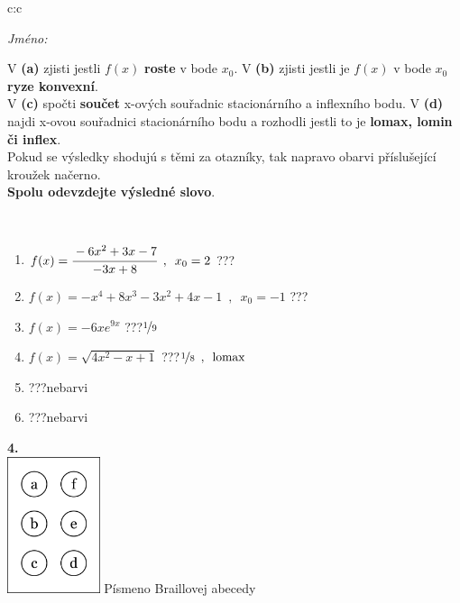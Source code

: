 \documentclass[10pt]{report}
\begin{document}
\begin{tabular}{c:c}
\begin{minipage}[c][104.5mm][t]{0.5\linewidth}
\begin{center}
\textit{Jméno:}\phantom{xxxxxxxxxxxxxxxxxxxxxxxxxxxxxxxxxxxxxxxxxxxxxxxxxxxxxxxxxxxxxxxxx}\\[5mm]
\begin{minipage}{0.95\linewidth}
\begin{center}
{\small V \textbf{(a)} zjisti jestli $f(x)$ \textbf{roste} v bode $x_0$. V \textbf{(b)} zjisti jestli je $f(x)$ v bode $x_0$ \textbf{ryze konvexní}.\\V \textbf{(c)} spočti \textbf{součet} x-ových souřadnic stacionárního a inflexního bodu. V \textbf{(d)} najdi x-ovou souřadnici stacionárního bodu a rozhodli jestli to je \textbf{lomax, lomin či inflex}.\\Pokud se výsledky shodujú s těmi za otazníky, tak napravo obarvi příslušející kroužek načerno.\\\textbf{Spolu odevzdejte výsledné slovo}}.
\end{center}
\end{minipage}
\\[1mm]
\begin{minipage}{0.79\linewidth}
\begin{center}
\begin{varwidth}{\linewidth}
\begin{enumerate}
\normalsize
\item $f(x)=\cfrac{-6x^2+3x-7}{-3x+8}\enspace , \enspace x_0=2$\quad \dotfill\; ???\;\dotfill \quad {}
\item $f(x)=-x^4+8x^3-3x^2+4x-1\enspace , \enspace x_0=-1$\quad \dotfill\; ???\;\dotfill \quad {}
\item $f(x)=-6xe^{9x}$\quad \dotfill\; ???\;\dotfill \quad $\nicefrac{1}{9}$
\item $f(x)=\sqrt{4x^2-x+1}$\quad \dotfill\; ???\;\dotfill \quad $\nicefrac{1}{8}\enspace , \enspace\mathrm{lomax}$
\item \quad \dotfill\; ???\;\dotfill \quad nebarvi
\item \quad \dotfill\; ???\;\dotfill \quad nebarvi
\end{enumerate}
\end{varwidth}
\end{center}
\end{minipage}
\begin{minipage}{0.20\linewidth}
\begin{center}
{\Huge\bfseries 4.} \\[2mm]
\includegraphics[height=40mm]{../images/braille.png}
{\small Písmeno Braillovej abecedy}
\end{center}
\end{minipage}
\end{center}
\end{minipage}
%
\end{tabular}
\end{document}
